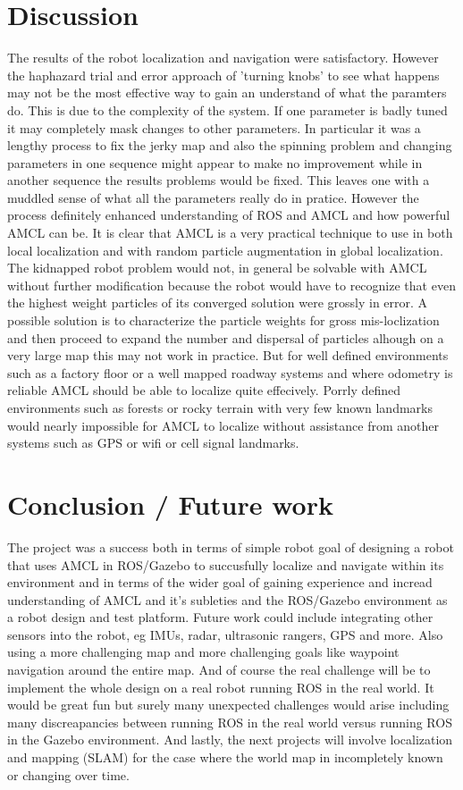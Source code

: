 \documentclass[10pt,journal,compsoc]{IEEEtran}
\begin{document}
\section{Discussion}
The results of the robot localization and navigation were satisfactory. However the haphazard trial and error approach of 'turning knobs' to see what happens may not be the most effective way to gain an understand of what the paramters do. This is due to the complexity of the system. If one parameter is badly tuned it may completely mask changes to other parameters. In particular it was a lengthy process to fix the jerky map and also the spinning problem and changing parameters in one sequence might appear to make no improvement while in another sequence the results problems would be fixed. This leaves one with a muddled sense of what all the parameters really do in pratice. However the process definitely enhanced understanding of ROS and AMCL and how powerful AMCL can be. It is clear that AMCL is a very practical technique to use in both local localization and with random particle augmentation in global localization. The kidnapped robot problem would not, in general be solvable with AMCL without further modification because the robot would have to recognize that even the highest weight particles of its converged solution were grossly in error. A possible solution is to characterize the particle weights for gross mis-loclization and then proceed to expand the number and dispersal of particles alhough on a very large map this may not work in practice. But for well defined environments such as a factory floor or a well mapped roadway systems and where odometry is reliable AMCL should be able to localize quite effecively. Porrly defined environments such as forests or rocky terrain with very few known landmarks would nearly impossible for AMCL to localize without assistance from another systems such as GPS or wifi or cell signal landmarks.

\section{Conclusion / Future work}
The project was a success both in terms of simple robot goal of designing a robot that uses AMCL in ROS/Gazebo to succusfully localize and navigate within its environment and in terms of the wider goal of gaining experience and incread understanding of AMCL and it's subleties and the ROS/Gazebo environment as a robot design and test platform. Future work could include integrating other sensors into the robot, eg IMUs, radar, ultrasonic rangers, GPS and more. Also using a more challenging map and more challenging goals like waypoint navigation around the entire map. And of course the real challenge will be to implement the whole design on a real robot running ROS in the real world. It would be great fun but surely many unexpected challenges would arise including many discreapancies between running ROS in the real world versus running ROS in the Gazebo environment. And lastly, the next projects will involve localization and mapping (SLAM) for the case where the world map in incompletely known or changing over time.
\end{document}
